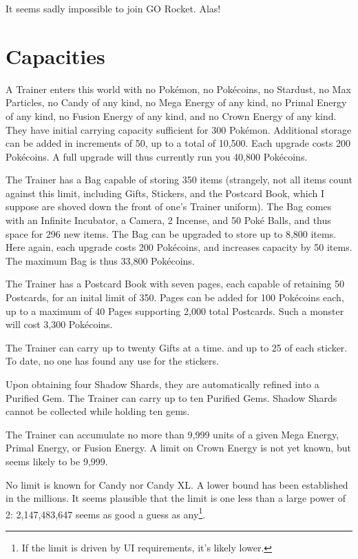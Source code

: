 It seems sadly impossible to join GO Rocket. Alas!

\section{Capacities}
A Trainer enters this world with no Pokémon, no Pokécoins, no Stardust,
  no Max Particles, no Candy of any kind, no Mega Energy of any kind,
  no Primal Energy of any kind, no Fusion Energy of any kind, and no Crown
  Energy of any kind.
They have initial carrying capacity sufficient for 300 Pokémon.
Additional storage can be added in increments of 50, up to a total of 10,500.
Each upgrade costs 200 Pokécoins.
A full upgrade will thus currently run you 40,800 Pokécoins.

The Trainer has a Bag capable of storing 350 items (strangely, not all items
  count against this limit, including Gifts, Stickers, and the Postcard Book,
  which I suppose are shoved down the front of one's Trainer uniform).
The Bag comes with an Infinite Incubator, a Camera, 2 Incense, and 50 Poké Balls,
  and thus space for 296 new items.
The Bag can be upgraded to store up to 8,800 items.
Here again, each upgrade costs 200 Pokécoins, and increases capacity by 50 items.
The maximum Bag is thus 33,800 Pokécoins.

The Trainer has a Postcard Book with seven pages, each capable of retaining
 50 Postcards, for an inital limit of 350.
Pages can be added for 100 Pokécoins each, up to a maximum of 40 Pages
 supporting 2,000 total Postcards.
Such a monster will cost 3,300 Pokécoins.

The Trainer can carry up to twenty Gifts at a time. and up to 25 of each sticker.
To date, no one has found any use for the stickers.

Upon obtaining four Shadow Shards, they are automatically refined into a Purified Gem.
The Trainer can carry up to ten Purified Gems.
Shadow Shards cannot be collected while holding ten gems.

The Trainer can accumulate no more than 9,999 units of a given Mega Energy,
 Primal Energy, or Fusion Energy.
A limit on Crown Energy is not yet known, but seems likely to be 9,999.

No limit is known for Candy nor Candy XL.
A lower bound has been established in the millions.
It seems plausible that the limit is one less than a large power of 2:
  2,147,483,647 seems as good a guess as any\footnote{If the limit is driven by UI requirements, it's likely lower.}.

